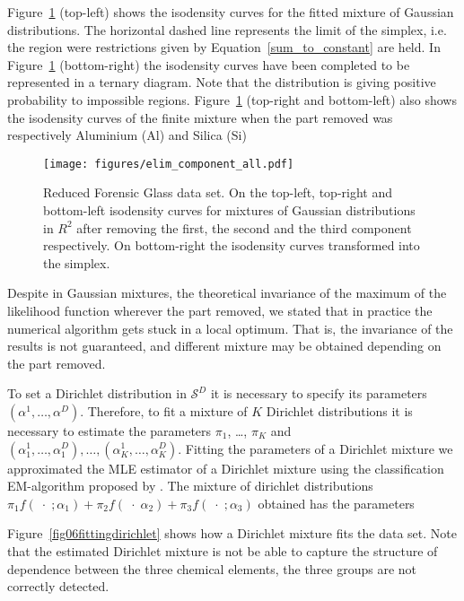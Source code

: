 \documentclass[12pt, a4paper]{article}
\begin{document}
{\small  }


Figure~\ref{fig05component_elimination} (top-left) shows the isodensity curves for the fitted mixture of Gaussian distributions. The horizontal dashed line represents the limit of the simplex, i.e. the region were restrictions given by Equation~\ref{sum_to_constant} are held. In Figure~\ref{fig05component_elimination} (bottom-right) the isodensity curves have been completed to be represented in a ternary diagram. Note that the distribution is giving positive probability to impossible regions. Figure~\ref{fig05component_elimination} (top-right and bottom-left) also shows the isodensity curves of the finite mixture when the part removed was respectively Aluminium (Al) and Silica (Si)

\begin{figure}[htbp]
\texttt{[image: figures/elim\_component\_all.pdf]}
\caption{Reduced Forensic Glass data set. On the top-left, top-right and bottom-left isodensity curves for mixtures of Gaussian distributions in $R^{2}$ after removing the first, the second and the third component respectively. On bottom-right the isodensity curves transformed into the simplex.}
\label{fig05component_elimination}
\end{figure}

Despite in Gaussian mixtures, the theoretical invariance of the maximum of the likelihood function wherever the part removed, we stated that in practice the numerical algorithm gets stuck in a local optimum. That is, the invariance of the results is not guaranteed, and different mixture may be obtained depending on the part removed. 

To set a Dirichlet distribution in $\mathcal{S}^D$ it is necessary to specify its parameters $\left( \alpha^1, \dots ,\alpha^D \right)$. Therefore, to fit a mixture of $K$ Dirichlet distributions it is necessary to estimate the parameters $\pi_1$, \dots, $\pi_K$ and $\left( \alpha^1_1, \dots ,\alpha^D_1 \right), \dots, \left( \alpha^1_K, \dots, \alpha^D_K \right)$. Fitting the parameters of a Dirichlet mixture we approximated the MLE estimator of a Dirichlet mixture using the classification EM-algorithm proposed by \cite{celeux1992classification}. The mixture of dirichlet distributions $
\pi_1 f(\;\cdot\; ; \alpha_1) + \pi_2 f(\;\cdot\; \alpha_2) + \pi_3 f(\;\cdot\; ; \alpha_3)
$
obtained has the parameters
{\small  }


Figure~\ref{fig06fittingdirichlet} shows how a Dirichlet mixture fits the data set. Note that the estimated Dirichlet mixture is not be able to capture the structure of dependence between the three chemical elements, the three groups are not correctly detected. 
\end{document}
